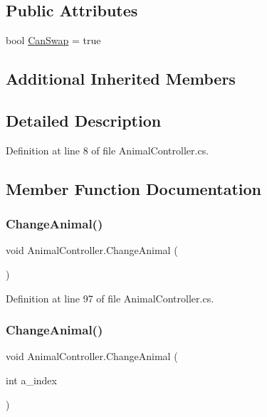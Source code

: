 \subsection*{Public Attributes}
\begin{DoxyCompactItemize}
\item 
bool \mbox{\hyperlink{class_animal_controller_ac65849c961c72fad67bd561d6b974ccc}{Can\+Swap}} = true
\end{DoxyCompactItemize}
\subsection*{Additional Inherited Members}


\subsection{Detailed Description}


Definition at line 8 of file Animal\+Controller.\+cs.



\subsection{Member Function Documentation}
\mbox{\label{class_animal_controller_afcab1e5b036dc710a090cd7dac94090e}} 
\subsubsection{\texorpdfstring{Change\+Animal()}{ChangeAnimal()}\hspace{0.1cm}{\footnotesize\ttfamily [1/3]}}
{\footnotesize\ttfamily void Animal\+Controller.\+Change\+Animal (\begin{DoxyParamCaption}{ }\end{DoxyParamCaption})}



Definition at line 97 of file Animal\+Controller.\+cs.

\mbox{\label{class_animal_controller_af0ae4eaa20fdc725a225b8062d5f6007}} 
\subsubsection{\texorpdfstring{Change\+Animal()}{ChangeAnimal()}\hspace{0.1cm}{\footnotesize\ttfamily [2/3]}}
{\footnotesize\ttfamily void Animal\+Controller.\+Change\+Animal (\begin{DoxyParamCaption}\item[{int}]{a\+\_\+index }\end{DoxyParamCaption})}



